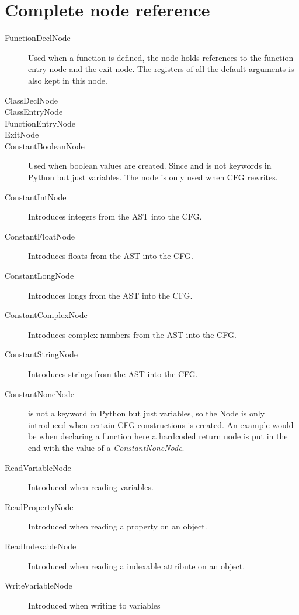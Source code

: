 \chapter{Complete node reference}

\begin{description}
	\item[FunctionDeclNode ] Used when a function is defined, the node holds references to the function entry node and the exit node. The registers of all the default arguments is also kept in this node.
	\item[ClassDeclNode ]  
	\item[ClassEntryNode]
	\item[FunctionEntryNode] 
	\item[ExitNode] 
	\item[ConstantBooleanNode] Used when boolean values are created. Since  and  is not keywords in Python but just variables. The node is only used when CFG rewrites. 
	\item[ConstantIntNode] Introduces integers from the AST into the CFG.
	\item[ConstantFloatNode] Introduces floats from the AST into the CFG.
	\item[ConstantLongNode] Introduces longs from the AST into the CFG.
	\item[ConstantComplexNode] Introduces complex numbers from the AST into the CFG.
	\item[ConstantStringNode] Introduces strings from the AST into the CFG.
	\item[ConstantNoneNode]  is not a keyword in Python but just variables, so the Node is only introduced when certain CFG constructions is created. An example would be when declaring a function here a hardcoded return node is put in the end with the value of a \textit{ConstantNoneNode}.
	\item[ReadVariableNode ] Introduced when reading variables.
	\item[ReadPropertyNode ] Introduced when reading a property on an object.
	\item[ReadIndexableNode ] Introduced when reading a indexable attribute on an object.
	\item[WriteVariableNode ] Introduced when writing to variables

\end{description}
